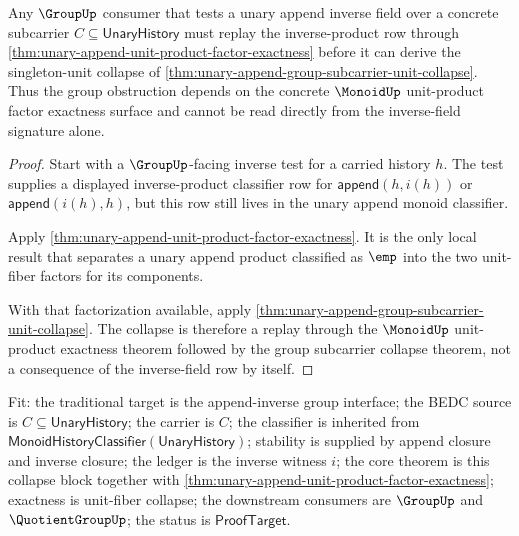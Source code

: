 \begin{theorem}
\label{thm:group-unary-append-inverse-obstruction-replay}
Any $\GroupUp$ consumer that tests a unary append inverse field over a concrete
subcarrier $C\subseteq\mathsf{UnaryHistory}$ must replay the inverse-product
row through \autoref{thm:unary-append-unit-product-factor-exactness} before it
can derive the singleton-unit collapse of
\autoref{thm:unary-append-group-subcarrier-unit-collapse}. Thus the group
obstruction depends on the concrete $\MonoidUp$ unit-product factor exactness
surface and cannot be read directly from the inverse-field signature alone.
\end{theorem}
\begin{proof}
Start with a $\GroupUp$-facing inverse test for a carried history $h$. The
test supplies a displayed inverse-product classifier row for
$\mathsf{append}(h,i(h))$ or $\mathsf{append}(i(h),h)$, but this row still
lives in the unary append monoid classifier.

Apply \autoref{thm:unary-append-unit-product-factor-exactness}. It is the
only local result that separates a unary append product classified as $\emp$
into the two unit-fiber factors for its components.

With that factorization available, apply
\autoref{thm:unary-append-group-subcarrier-unit-collapse}. The collapse is
therefore a replay through the $\MonoidUp$ unit-product exactness theorem
followed by the group subcarrier collapse theorem, not a consequence of the
inverse-field row by itself.
\end{proof}

Fit: the traditional target is the append-inverse group interface; the BEDC
source is $C\subseteq\mathsf{UnaryHistory}$; the carrier is $C$; the classifier
is inherited from $\mathsf{MonoidHistoryClassifier}(\mathsf{UnaryHistory})$;
stability is supplied by append closure and inverse closure; the ledger is the
inverse witness $i$; the core theorem is this collapse block together with
\autoref{thm:unary-append-unit-product-factor-exactness}; exactness is
unit-fiber collapse; the downstream consumers are $\GroupUp$ and
$\QuotientGroupUp$; the status is $\mathsf{ProofTarget}$.

